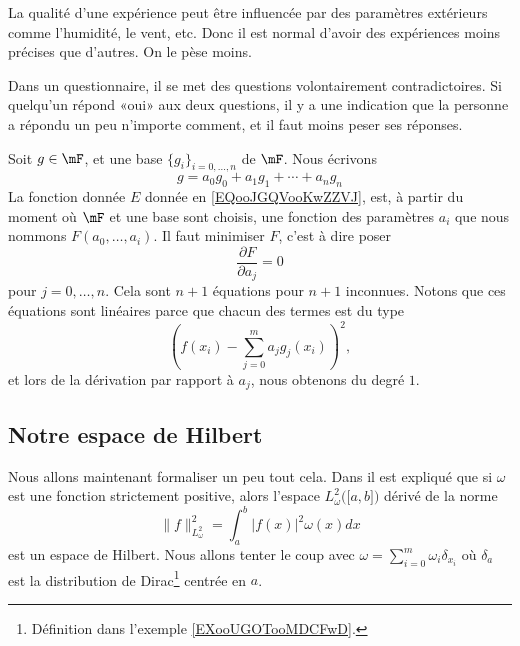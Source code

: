 \begin{example}
    La qualité d'une expérience peut être influencée par des paramètres extérieurs comme l'humidité, le vent, etc. Donc il est normal d'avoir des expériences moins précises que d'autres. On le pèse moins.
\end{example}

\begin{example}
    Dans un questionnaire, il se met des questions volontairement contradictoires. Si quelqu'un répond «oui» aux deux questions, il y a une indication que la personne a répondu un peu n'importe comment, et il faut moins peser ses réponses.
\end{example}

Soit \( g\in \mF\), et une base \( \{ g_i \}_{i=0,\ldots, n}\) de \( \mF\). Nous écrivons
\begin{equation}
    g=a_0g_0+a_1g_1+\cdots +a_ng_n
\end{equation}
La fonction donnée \( E\) donnée en \eqref{EQooJGQVooKwZZVJ}, est, à partir du moment où \( \mF\) et une base sont choisis, une fonction des paramètres \( a_i\) que nous nommons \( F(a_0,\ldots, a_i)\). Il faut minimiser \( F\), c'est à dire poser
\begin{equation}
    \frac{ \partial F }{ \partial a_j }=0
\end{equation}
pour \( j=0,\ldots, n\). Cela sont \( n+1\) équations pour \( n+1\) inconnues. Notons que ces équations sont linéaires parce que chacun des termes est du type
\begin{equation}
    \left( f(x_i)-\sum_{j=0}^ma_jg_j(x_i) \right)^2,
\end{equation}
et lors de la dérivation par rapport à \( a_j\), nous obtenons du degré \( 1\). 

\subsection{Notre espace de Hilbert}

Nous allons maintenant formaliser un peu tout cela. Dans \cite{ooPTFGooScbUWC} il est expliqué que si \( \omega\) est une fonction strictement positive, alors l'espace \( L^2_{\omega}\big( \mathopen[ a , b \mathclose] \big)\) dérivé de la norme
\begin{equation}
    \| f \|_{L^2_{\omega}}^2=\int_a^b| f(x) |^2\omega(x)dx
\end{equation}
est un espace de Hilbert. Nous allons tenter le coup avec \( \omega=\sum_{i=0}^m\omega_i\delta_{x_i}\) où \( \delta_a\) est la distribution de Dirac\footnote{Définition dans l'exemple \ref{EXooUGOTooMDCFwD}.} centrée en \( a\).

